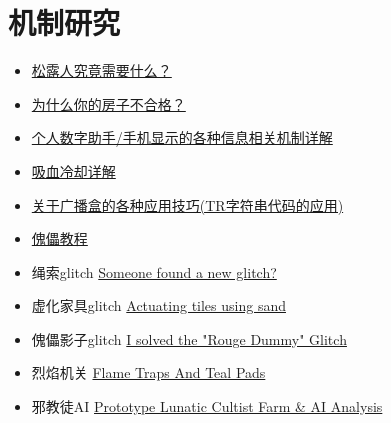 \section{机制研究}
\begin{itemize}
\item \href{https://www.bbstr.net/threads/469/}{松露人究竟需要什么？}
\item \href{https://www.bbstr.net/threads/463/}{为什么你的房子不合格？} 
\item \href{https://www.bbstr.net/threads/133/}{个人数字助手/手机显示的各种信息相关机制详解}
\item \href{https://www.bbstr.net/threads/lifesteal.198/}{吸血冷却详解}
\item \href{https://www.bbstr.net/threads/tr.127/}{关于广播盒的各种应用技巧(TR字符串代码的应用)}
\item \href{https://www.bilibili.com/read/cv2156999}{傀儡教程}
\item 绳索glitch \href{https://forums.terraria.org/index.php?threads/someone-found-a-new-glitch.75822/}{Someone found a new glitch?}
\item 虚化家具glitch \href{https://forums.terraria.org/index.php?threads/actuating-tiles-using-sand.75811/}{Actuating tiles using sand}
\item 傀儡影子glitch \href{https://forums.terraria.org/index.php?threads/i-solved-the-rouge-dummy-glitch.76951/}{I solved the "Rouge Dummy" Glitch}
\item 烈焰机关 \href{https://forums.terraria.org/index.php?threads/flame-traps-and-teal-pads.76835/}{Flame Traps And Teal Pads}
\item 邪教徒AI \href{https://forums.terraria.org/index.php?threads/prototype-lunatic-cultist-farm-ai-analysis.77022/}{Prototype Lunatic Cultist Farm \& AI Analysis}
\end{itemize}

